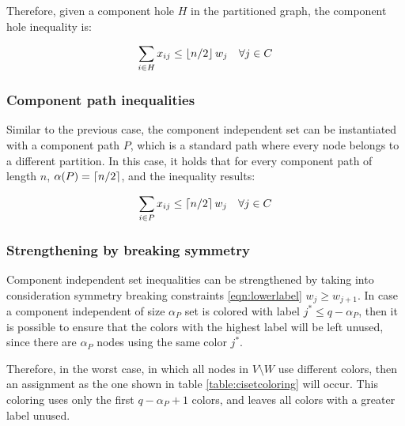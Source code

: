 Therefore, given a component hole $H$ in the partitioned graph, the component hole inequality is:

\begin{equation}
\label{ineq:chole}
\sum _{i \in H} x_{ij} \leq \left\lfloor n / 2 \right\rfloor w_{j} \quad \forall j \in C
\end{equation}


\subsubsection*{Component path inequalities}

Similar to the previous case, the component independent set can be instantiated with a component path $P$, which is a standard path where every node belongs to a different partition. In this case, it holds that for every component path of length $n$, $\alpha(P) = \left\lceil n / 2 \right\rceil$, and the inequality results:

\begin{equation}
\label{ineq:cpath}
\sum _{i \in P} x_{ij} \leq \left\lceil n / 2 \right\rceil w_{j} \quad \forall j \in C
\end{equation}

\subsubsection*{Strengthening by breaking symmetry}

Component independent set inequalities can be strengthened by taking into consideration symmetry breaking constraints \ref{eqn:lowerlabel} $w_j \geq w_{j+1}$. In case a component independent of size $\alpha_P$ set is colored with label $j^* \leq q - \alpha_P$, then it is possible to ensure that the colors with the highest label will be left unused, since there are $\alpha_P$ nodes using the same color $j^*$.

Therefore, in the worst case, in which all nodes in $V \setminus W$ use different colors, then an assignment as the one shown in table \ref{table:cisetcoloring} will occur. This coloring uses only the first $q - \alpha_P + 1$ colors, and leaves all colors with a greater label unused. 

